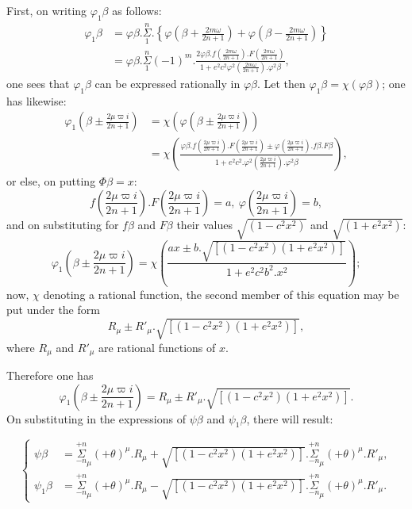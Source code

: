 \documentclass{article}
\begin{document}
First, on writing $\varphi_{1}\beta$ as follows:
\[ \begin{aligned}
\varphi_{1}\beta&=\varphi\beta.\overset{n}{\underset{1}{\Sigma}}.\left\{\varphi\left(\beta+\frac{2m\omega}{2n+1}\right)+\varphi\left(\beta-\frac{2m\omega}{2n+1}\right)\right\}\\
&=\varphi\beta.\overset{n}{\underset{1}{\Sigma}}(-1)^{m}.\frac{2\varphi\beta.f\left(\frac{2m\omega}{2n+1}\right).F\left(\frac{2m\omega}{2n+1}\right)}{1+e^{2}c^{2}\varphi^{2}\left(\frac{2m\omega}{2n+1}\right).\varphi^{2}\beta},
\end{aligned} \]
one sees that $\varphi_{1}\beta$ can be expressed rationally in $\varphi\beta$. Let then $\varphi_{1}\beta=\chi(\varphi\beta)$; one has likewise:
\[ \begin{aligned}
\varphi_{1}\left(\beta\pm\frac{2\mu\varpi i}{2n+1}\right)&=\chi\left(\varphi\left(\beta\pm\frac{2\mu\varpi i}{2n+1}\right)\right)\\
&=\chi\left(\frac{\varphi\beta.f\left(\frac{2\mu\varpi i}{2n+1}\right).F\left(\frac{2\mu\varpi i}{2n+1}\right)\pm\varphi\left(\frac{2\mu\varpi i}{2n+1}\right).f\beta.F\beta}{1+e^{2}c^{2}.\varphi^{2}\left(\frac{2\mu\varpi i}{2n+1}\right).\varphi^{2}\beta}\right),
\end{aligned} \]
or else, on putting $\Phi\beta=x$:
\[ f\left(\frac{2\mu\varpi i}{2n+1}\right).F\left(\frac{2\mu\varpi i}{2n+1}\right)=a,\ \varphi\left(\frac{2\mu\varpi i}{2n+1}\right)=b, \]
and on substituting for $f\beta$ and $F\beta$ their values $\sqrt{(1-c^{2}x^{2})}$ and $\sqrt{(1+e^{2}x^{2})}$:
\[ \varphi_{1}\left(\beta\pm\frac{2\mu\varpi i}{2n+1}\right)=\chi\left(\frac{ax\pm b.\sqrt{[(1-c^{2}x^{2})(1+e^{2}x^{2})]}}{1+e^{2}c^{2}b^{2}.x^{2}}\right); \]
now, $\chi$ denoting a rational function, the second member of this equation may be put under the form
\[ R_{\mu}\pm R'_{\mu}.\sqrt{[(1-c^{2}x^{2})(1+e^{2}x^{2})]}, \]
where $R_{\mu}$ and $R'_{\mu}$ are rational functions of $x$.

Therefore one has
\[ \varphi_{1}\left(\beta\pm\frac{2\mu\varpi i}{2n+1}\right)=R_{\mu}\pm R'_{\mu}.\sqrt{[(1-c^{2}x^{2})(1+e^{2}x^{2})]}. \]
On substituting in the expressions of $\psi\beta$ and $\psi_{1}\beta$, there will result:

\[ \left\{\begin{aligned}
\psi\beta&=\overset{+n}{\underset{-n}{\Sigma}}_{\mu}(+\theta)^{\mu}.R_{\mu}+\sqrt{[(1-c^{2}x^{2})(1+e^{2}x^{2})]}.\overset{+n}{\underset{-n}{\Sigma}}_{\mu}(+\theta)^{\mu}.R'_{\mu},\\
\psi_{1}\beta&=\overset{+n}{\underset{-n}{\Sigma}}_{\mu}(+\theta)^{\mu}.R_{\mu}-\sqrt{[(1-c^{2}x^{2})(1+e^{2}x^{2})]}.\overset{+n}{\underset{-n}{\Sigma}}_{\mu}(+\theta)^{\mu}.R'_{\mu}.
\end{aligned}\right. \tag{70.} \]
\end{document}
